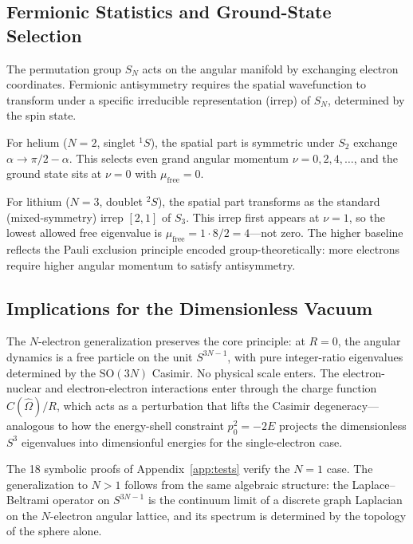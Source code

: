 \documentclass[aps,pra,twocolumn,superscriptaddress,longbibliography]{revtex4-2}
\begin{document}
\subsection{Fermionic Statistics and Ground-State Selection}

The permutation group $S_N$ acts on the angular manifold by
exchanging electron coordinates.  Fermionic antisymmetry requires
the spatial wavefunction to transform under a specific irreducible
representation (irrep) of $S_N$, determined by the spin state.

For helium ($N = 2$, singlet ${}^1S$), the spatial part is
symmetric under $S_2$ exchange $\alpha \to \pi/2 - \alpha$.
This selects even grand angular momentum $\nu = 0, 2, 4, \ldots$,
and the ground state sits at $\nu = 0$ with $\mu_{\mathrm{free}} = 0$.

For lithium ($N = 3$, doublet ${}^2S$), the spatial part transforms
as the standard (mixed-symmetry) irrep $[2,1]$ of $S_3$.  This
irrep first appears at $\nu = 1$, so the lowest allowed free
eigenvalue is $\mu_{\mathrm{free}} = 1 \cdot 8/2 = 4$---not zero.
The higher baseline reflects the Pauli exclusion principle encoded
group-theoretically: more electrons require higher angular momentum
to satisfy antisymmetry.

\subsection{Implications for the Dimensionless Vacuum}

The $N$-electron generalization preserves the core principle: at
$R = 0$, the angular dynamics is a free particle on the unit
$S^{3N-1}$, with pure integer-ratio eigenvalues determined by
the $\mathrm{SO}(3N)$ Casimir.  No physical scale enters.  The
electron-nuclear and electron-electron interactions enter through
the charge function $C(\hat{\Omega})/R$, which acts as a
perturbation that lifts the Casimir degeneracy---analogous to how
the energy-shell constraint $p_0^2 = -2E$ projects the dimensionless
$S^3$ eigenvalues into dimensionful energies for the single-electron
case.

The 18 symbolic proofs of Appendix~\ref{app:tests} verify the
$N = 1$ case.  The generalization to $N > 1$ follows from the same
algebraic structure: the Laplace--Beltrami operator on $S^{3N-1}$
is the continuum limit of a discrete graph Laplacian on the
$N$-electron angular lattice, and its spectrum is determined by
the topology of the sphere alone.


\end{document}
